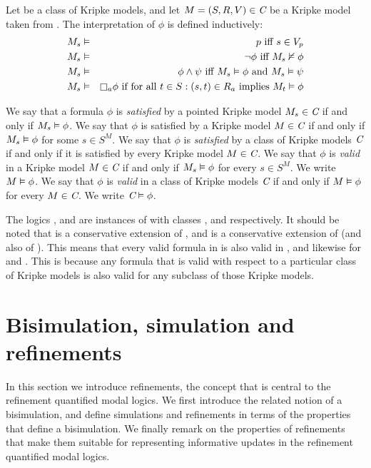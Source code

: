\begin{definition}
Let \classC{} be a class of Kripke models, and let $M = (S, R, V) \in \textit{C}$
be a Kripke model taken from \classC{}. The interpretation of $\phi$ is defined
inductively:
\begin{eqnarray*}
M_s &\entails& p \text{ iff } s \in V_p\\
M_s &\entails& \neg \phi \text{ iff } M_s \nentails \phi\\
M_s &\entails& \phi \land \psi \text{ iff } M_s \entails \phi \text{ and } M_s
\entails \psi\\
M_s &\entails& \knows_a \phi \text{ if for all } t \in S : (s, t) \in R_a \text{
implies } M_t \entails \phi
\end{eqnarray*}
\end{definition}

We say that a formula $\phi$ is {\em satisfied} by a pointed Kripke model $M_s
\in \textit{C}$ if and only if $M_s \vDash \phi$. We say that $\phi$ is satisfied
by a Kripke model $M \in \textit{C}$ if and only if $M_s \vDash \phi$ for some $s
\in S^M$. We say that $\phi$ is {\em satisfied} by a class of Kripke models
$\textit{C}$ if and only if it is satisfied by every Kripke model $M \in \textit{C}$.
We say that $\phi$ is {\em valid} in a Kripke model $M \in \textit{C}$ if and only
if $M_s \vDash \phi$ for every $s \in S^M$. We write $M \vDash \phi$. We say
that $\phi$ is {\em valid} in a class of Kripke models $\textit{C}$ if and only if
$M \vDash \phi$ for every $M \in \textit{C}$. We write $\textit{C} \vDash \phi$.

The logics \logicK{}, \logicKD{} and \logicS{} are instances of \logicC{} with
classes \classK{}, \classKD{} and \classS{} respectively. It should be noted
that \logicKD{} is a conservative extension of \logicK{}, and \logicS{} is a
conservative extension of \logicKD{} (and also of \logicK{}). This means that
every valid formula in \logicK{} is also valid in \logicKD{}, and likewise for
\logicKD{} and \logicS{}. This is because any formula that is valid with respect
to a particular class of Kripke models is also valid for any subclass of those
Kripke models.

\section{Bisimulation, simulation and refinements}

In this section we introduce refinements, the concept that is central to the
refinement quantified modal logics. We first introduce the related notion of a
bisimulation, and define simulations and refinements in terms of the properties
that define a bisimulation. We finally remark on the properties of refinements
that make them suitable for representing informative updates in the refinement
quantified modal logics.

